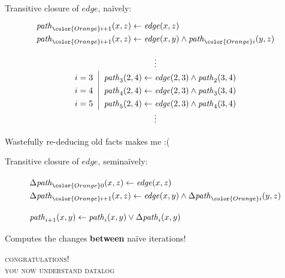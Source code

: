 \documentclass[dvipsnames]{beamer}
\newcommand\D\Delta
\newcommand\rel[1]{\ensuremath{\mathit{#1}}}
\newcommand\naive{na\"ive}
\newcommand\hil{\color{Orange}}
\begin{document}
\begin{frame}
  \LARGE
  Transitive closure of \rel{edge}, \naive{}ly:
  \[
  \begin{array}{l}
    \rel{path}_{\hil i+1}(x,z) \leftarrow \rel{edge}(x,z)\\
    \rel{path}_{\hil i+1}(x,z) \leftarrow \rel{edge}(x,y) \wedge \rel{path}_{\hil i}(y,z)
  \end{array}
  \]
\end{frame}

\begin{frame}
  \Large
  \[
  \def\arraystretch{1.3}
  \setlength\arraycolsep{.667em}
  \begin{array}{r|l}
    \multicolumn{2}{c}{\vdots}\\
    i = 3 &
    \rel{path}_3(2,4) \leftarrow \rel{edge}(2,3) \wedge \rel{path}_2(3,4)\\
    i = 4 &
    \rel{path}_4(2,4) \leftarrow \rel{edge}(2,3) \wedge \rel{path}_3(3,4)\\
    i = 5 &
    \rel{path}_5(2,4) \leftarrow \rel{edge}(2,3) \wedge \rel{path}_4(3,4)\\
    \multicolumn{2}{c}{\vdots}
  \end{array}
  \]

  \color{red} Wastefully re-deducing old facts makes me :(
\end{frame}

\begin{frame}
  \Large
  Transitive closure of \rel{edge}, semi\naive{}ly:\vspace{1em}

  \[
  \begin{array}{l}
    \D\rel{path}_{\hil 0}(x,z) \leftarrow \rel{edge}(x,z)\\
    \D\rel{path}_{\hil i+1}(x,z) \leftarrow \rel{edge}(x,y) \wedge \D\rel{path}_{\hil i}(y,z)
    \\[1em]
    \rel{path}_{i+1}(x,y) \leftarrow \rel{path}_i(x,y) \vee \D\rel{path}_i(x,y)
  \end{array}
  \]

  \vspace{1em}
  Computes the changes \textbf{between} \naive{} iterations!
\end{frame}


\begin{frame}
  \huge\centering\scshape congratulations!\\you now understand datalog %
\end{frame}
\end{document}
